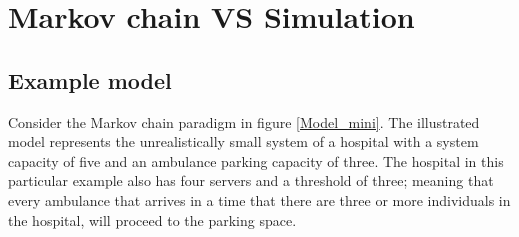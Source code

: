 \section{Markov chain VS Simulation}

\subsection{Example model}
Consider the Markov chain paradigm in figure \ref{Model_mini}. The illustrated model represents the unrealistically small system of a hospital with a system capacity of five and an ambulance parking capacity of three. The hospital in this particular example also has four servers and a threshold of three; meaning that every ambulance that arrives in a time that there are three or more individuals in the hospital, will proceed to the parking space.

